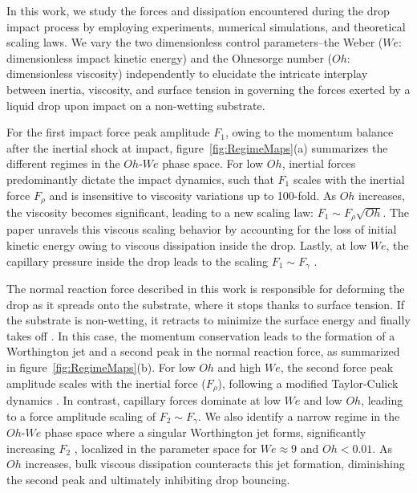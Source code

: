 \documentclass{jfm}
\begin{document}
	In this work, we study the forces and dissipation encountered during the drop impact process by employing experiments, numerical simulations, and theoretical scaling laws. We vary the two dimensionless control parameters--the Weber ($We$: dimensionless impact kinetic energy) and the Ohnesorge number ($Oh$: dimensionless viscosity) independently to elucidate the intricate interplay between inertia, viscosity, and surface tension in governing the forces exerted by a liquid drop upon impact on a non-wetting substrate.
	
	For the first impact force peak amplitude $F_1$, owing to the momentum balance after the inertial shock at impact, figure~\ref{fig:RegimeMaps}(a) summarizes the different regimes in the $Oh$-$We$ phase space. For low $Oh$, inertial forces predominantly dictate the impact dynamics, such that $F_1$ scales with the inertial force $F_\rho$ \citep{Philippi2016, Gordillo2018, Mitchell2019, cheng2021drop, zhang2022impact} and is insensitive to viscosity variations up to 100-fold. As $Oh$ increases, the viscosity becomes significant, leading to a new scaling law: $F_1 \sim F_\rho\sqrt{Oh}$. The paper unravels this viscous scaling behavior by accounting for the loss of initial kinetic energy owing to viscous dissipation inside the drop. Lastly, at low $We$, the capillary pressure inside the drop leads to the scaling $F_1 \sim F_\gamma$ \citep{molavcek2012quasi, chevy2012liquid}. 
	
	The normal reaction force described in this work is responsible for deforming the drop as it spreads onto the substrate, where it stops thanks to surface tension. If the substrate is non-wetting, it retracts to minimize the surface energy and finally takes off \citep{Richard2000}. In this case, the momentum conservation leads to the formation of a Worthington jet and a second peak in the normal reaction force, as summarized in figure~\ref{fig:RegimeMaps}(b). For low $Oh$ and high $We$, the second force peak amplitude scales with the inertial force ($F_\rho$), following a modified Taylor-Culick dynamics \citep{Eggers2010}. In contrast, capillary forces dominate at low $We$ and low $Oh$, leading to a force amplitude scaling of $F_2 \sim F_\gamma$. We also identify a narrow regime in the $Oh$-$We$ phase space where a singular Worthington jet forms, significantly increasing $F_2$ \citep{Bartolo2006Singular, zhang2022impact}, localized in the parameter space for $We \approx 9$ and $Oh < 0.01$. As $Oh$ increases, bulk viscous dissipation counteracts this jet formation, diminishing the second peak and ultimately inhibiting drop bouncing. 
	
\end{document}
